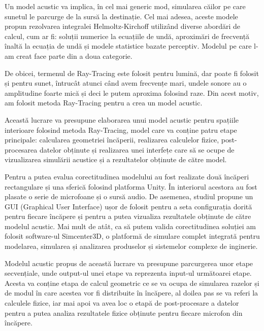 Un model acustic va implica, în cel mai generic mod, simularea căilor pe care sunetul le parcurge de la sursă la destinație. Cel mai adesea, aceste modele propun rezolvarea integralei Helmoltz-Kirchoff \cite{kirchoff} utilizând diverse abordări de calcul, cum ar fi: soluții numerice la ecuațiile de undă, aproximări de frecvență înaltă la ecuația de undă și modele statistice bazate perceptiv. Modelul pe care l-am creat face parte din a doua categorie.

De obicei, termenul de Ray-Tracing este folosit pentru lumină, dar poate fi folosit și pentru sunet, întrucât atunci când avem frecvențe mari, undele sonore au o amplitudine foarte mică și deci le putem aproxima folosind raze. Din acest motiv, am folosit metoda Ray-Tracing pentru a crea un model acustic.

Această lucrare va presupune elaborarea unui model acustic pentru spațiile interioare folosind metoda Ray-Tracing, model care va conține patru etape principale: calcularea geometriei încăperii, realizarea calculelor fizice, post-procesarea datelor obținute și realizarea unei interfețe care să se ocupe de vizualizarea simulării acustice și a rezultatelor obținute de către model.

Pentru a putea evalua corectitudinea modelului au fost realizate două încăperi rectangulare și una sferică folosind platforma Unity. În interiorul acestora au fost plasate o serie de microfoane și o sursă audio. De asemenea, studiul propune un GUI (Graphical User Interface) ușor de folosit pentru a seta configurația dorită pentru fiecare încăpere și pentru a putea vizualiza rezultatele obținute de către modelul acustic. Mai mult de atât, ca să putem valida corectitudinea soluției am folosit software-ul Simcenter3D, o platformă de simulare complet integrată pentru modelarea, simularea și analizarea produselor și sistemelor complexe de inginerie.

Modelul acustic propus de această lucrare va presupune parcurgerea unor etape secvențiale, unde output-ul unei etape va reprezenta input-ul următoarei etape. Acesta va conține etapa de calcul geometric ce se va ocupa de simularea razelor și de modul în care acestea vor fi distribuite în încăpere, al doilea pas se va referi la calculele fizice, iar mai apoi va avea loc o etapă de post-procesare a datelor pentru a putea analiza rezultatele fizice obținute pentru fiecare microfon din încăpere.

